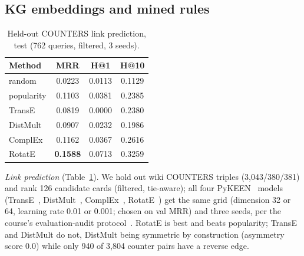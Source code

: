 \subsection{KG embeddings and mined rules}
\label{sec:kg}

\begin{table}[t]
\caption{Held-out COUNTERS link prediction, test (762 queries, filtered, 3 seeds).}
\label{tab:kg}
\centering\scriptsize
\setlength{\tabcolsep}{3pt}
\begin{tabular}{@{}lccc@{}}
\toprule
Method & MRR & H@1 & H@10\\
\midrule
random & 0.0223 & 0.0113 & 0.1129\\
popularity & 0.1103 & 0.0381 & 0.2385\\
TransE & 0.0819 & 0.0000 & 0.2380\\
DistMult & 0.0907 & 0.0232 & 0.1986\\
ComplEx & 0.1162 & 0.0367 & 0.2616\\
RotatE & \textbf{0.1588} & 0.0713 & 0.3259\\
\bottomrule
\end{tabular}
\end{table}

\emph{Link prediction} (Table~\ref{tab:kg}). We hold out wiki COUNTERS triples (3,043/380/381) and rank 126 candidate cards (filtered, tie-aware); all four PyKEEN~\cite{ali2021pykeen} models (TransE~\cite{bordes2013transe}, DistMult~\cite{yang2015distmult}, ComplEx~\cite{trouillon2016complex}, RotatE~\cite{sun2019rotate}) get the same grid (dimension 32 or 64, learning rate 0.01 or 0.001; chosen on val MRR) and three seeds, per the course's evaluation-audit protocol~\cite{ruffinelli2020olddog,sun2020reevaluation,cap6938L05}. RotatE is best and beats popularity; TransE and DistMult do not, DistMult being symmetric by construction (asymmetry score 0.0) while only 940 of 3,804 counter pairs have a reverse edge. %

